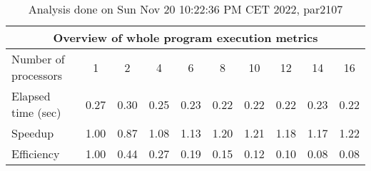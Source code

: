 \begin{table}[h]
\begin{center}
\begin{tabular}{|l|c|c|c|c|c|c|c|c|c|}
\hline
\multicolumn{10}{|c|}{Overview of whole program execution metrics} \\
\hline
\hline
Number of processors & 1 & 2 & 4 & 6 & 8 & 10 & 12 & 14 & 16 \\
\hline
Elapsed time (sec)      &       0.27 &       0.30 &       0.25 &       0.23 &       0.22 &       0.22 &       0.22 &       0.23 &       0.22 \\
\hline
Speedup                 &       1.00 &       0.87 &       1.08 &       1.13 &       1.20 &       1.21 &       1.18 &       1.17 &       1.22 \\
\hline
Efficiency              &       1.00 &       0.44 &       0.27 &       0.19 &       0.15 &       0.12 &       0.10 &       0.08 &       0.08 \\
\hline
\end{tabular}
\end{center}
\caption{ Analysis done on Sun Nov 20 10:22:36 PM CET 2022, par2107}
\end{table}

